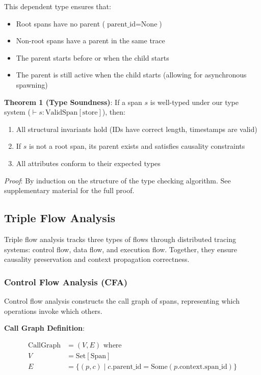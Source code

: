 This dependent type ensures that:

\begin{itemize}
\item Root spans have no parent ($\text{parent\_id} = \text{None}$)
\item Non-root spans have a parent in the same trace
\item The parent starts before or when the child starts
\item The parent is still active when the child starts (allowing for asynchronous spawning)
\end{itemize}

\textbf{Theorem 1 (Type Soundness)}:
If a span $s$ is well-typed under our type system ($\vdash s : \text{ValidSpan}[\text{store}]$), then:

\begin{enumerate}
\item All structural invariants hold (IDs have correct length, timestamps are valid)
\item If $s$ is not a root span, its parent exists and satisfies causality constraints
\item All attributes conform to their expected types
\end{enumerate}

\emph{Proof}: By induction on the structure of the type checking algorithm. See supplementary material for the full proof.

\subsection{Triple Flow Analysis}
\label{sec:flow}

Triple flow analysis tracks three types of flows through distributed tracing systems: control flow, data flow, and execution flow. Together, they ensure causality preservation and context propagation correctness.

\subsubsection{Control Flow Analysis (CFA)}

Control flow analysis constructs the call graph of spans, representing which operations invoke which others.

\textbf{Call Graph Definition}:

\begin{align*}
\text{CallGraph} &= (V, E) \text{ where} \\
V &= \text{Set}[\text{Span}] \\
E &= \{(p, c) \mid c.\text{parent\_id} = \text{Some}(p.\text{context}.\text{span\_id})\}
\end{align*}

